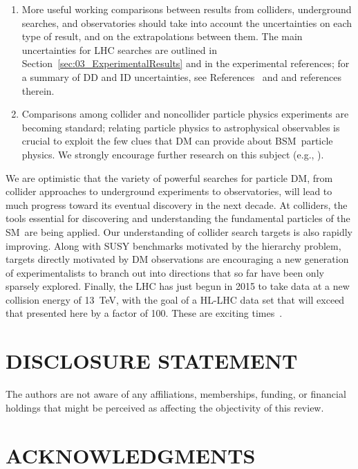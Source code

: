 \documentclass{ar-1col}
\begin{document}
\begin{issues}
\begin{enumerate}
\item More useful working comparisons between results from colliders,
underground searches, and observatories should take into account
the uncertainties on each type of result, and on the
extrapolations between them. The main uncertainties for LHC
searches are outlined in
Section~\ref{sec:03_ExperimentalResults} and in the experimental
references; for a summary of DD and ID uncertainties, see
References~ and  and
references therein.

\item Comparisons among collider and noncollider particle physics
experiments are becoming standard; relating particle physics to
astrophysical observables is crucial to exploit the few clues that
DM can provide about BSM\ particle physics. We
strongly encourage further research on this subject (e.g.,
).
\end{enumerate}
\end{issues}

We are optimistic that the variety of powerful searches for
particle DM, from collider approaches to underground
experiments to observatories, will lead to much progress toward its eventual discovery
in the next decade. At colliders, the tools essential for
discovering and understanding the fundamental particles of the
SM\ are being applied. Our understanding of
collider search targets is also rapidly improving. Along with SUSY
benchmarks motivated by the hierarchy problem, targets directly
motivated by DM observations are encouraging a new generation of
experimentalists to branch out into directions that so far have been only
sparsely explored. Finally, the LHC has just begun in 2015 to
take data at a new collision energy of 13~TeV, with the goal of a
HL-LHC data set that will exceed that presented here by a factor of 100. These
are exciting times~\cite{Steigman:1979kw}.

\section*{DISCLOSURE STATEMENT}

The authors are not aware of any affiliations, memberships,
funding, or financial holdings that might be perceived as
affecting the objectivity of this review.

\section*{ACKNOWLEDGMENTS}
\end{document}
